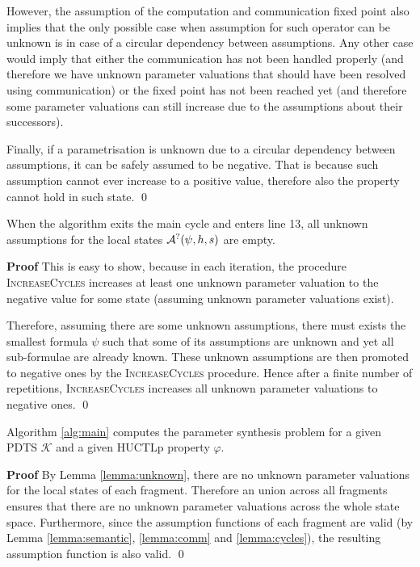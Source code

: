
However, the assumption of the computation and communication fixed point also implies that the only possible case when assumption for such operator can be unknown is in case of a circular dependency between assumptions. Any other case would imply that either the communication has not been handled properly (and therefore we have unknown parameter valuations that should have been resolved using communication) or the fixed point has not been reached yet (and therefore some parameter valuations can still increase due to the assumptions about their successors).

Finally, if a parametrisation is unknown due to a circular dependency between assumptions, it can be safely assumed to be negative. That is because such assumption cannot ever increase to a positive value, therefore also the property cannot hold in such state. \qed

\begin{lemma}
	\label{lemma:unknown}
	When the algorithm exits the main cycle and enters line 13, all unknown assumptions for the local states $\mathcal{A}^?(\psi, h, s)$ are empty.
\end{lemma}

\textbf{Proof} This is easy to show, because in each iteration, the procedure \textsc{IncreaseCycles} increases at least one unknown parameter valuation to the negative value for some state (assuming unknown parameter valuations exist). 

Therefore, assuming there are some unknown assumptions, there must exists the smallest formula $\psi$ such that some of its assumptions are unknown and yet all sub-formulae are already known. These unknown assumptions are then promoted to negative ones by the \textsc{IncreaseCycles} procedure. Hence after a finite number of repetitions, \textsc{IncreaseCycles} increases all unknown parameter valuations to negative ones. \qed

\begin{theorem}
	Algorithm \ref{alg:main} computes the parameter synthesis problem for a given \ac{PDTS} $\mathcal{K}$ and a given \ac{HUCTLp} property $\varphi$.
\end{theorem}

\textbf{Proof} By Lemma \ref{lemma:unknown}, there are no unknown parameter valuations for the local states of each fragment. Therefore an union across all fragments ensures that there are no unknown parameter valuations across the whole state space. Furthermore, since the assumption functions of each fragment are valid (by Lemma 	\ref{lemma:semantic}, \ref{lemma:comm} and \ref{lemma:cycles}), the resulting assumption function is also valid. \qed

